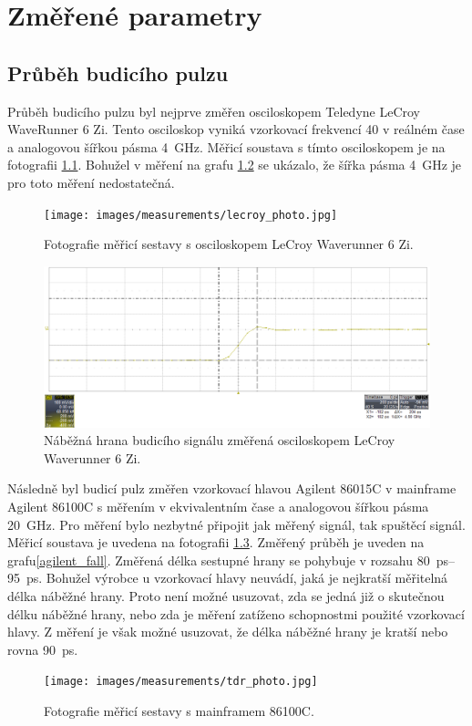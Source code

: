 \chapter{Změřené parametry}

\section{Průběh budicího pulzu}
Průběh budicího pulzu byl nejprve změřen osciloskopem Teledyne LeCroy WaveRunner 6 Zi. Tento osciloskop vyniká vzorkovací frekvencí \SI{40}{\gigasample} v reálném čase a analogovou šířkou pásma \SI{4}{\giga\hertz}. Měřicí soustava s tímto osciloskopem je na fotografii \ref{lecroy_photo}. Bohužel v měření na grafu \ref{lecroy} se ukázalo, že šířka pásma \SI{4}{\giga\hertz} je pro toto měření nedostatečná.

\begin{figure}[htbp]
\texttt{[image: images/measurements/lecroy\_photo.jpg]}\caption{Fotografie měřicí sestavy s osciloskopem LeCroy Waverunner 6 Zi.}\label{lecroy_photo}
\end{figure}

\begin{figure}[htbp]
\includegraphics[width=\textwidth,keepaspectratio]{images/measurements/lecroy.png}\caption{Náběžná hrana budicího signálu změřená osciloskopem LeCroy Waverunner 6 Zi.}\label{lecroy}
\end{figure}

Následně byl budicí pulz změřen vzorkovací hlavou Agilent 86015C v mainframe Agilent 86100C s měřením v ekvivalentním čase a analogovou šířkou pásma \SI{20}{\giga\hertz}. Pro měření bylo nezbytné připojit jak měřený signál, tak spuštěcí signál. Měřicí soustava je uvedena na fotografii \ref{agilent_photo}. Změřený průběh je uveden na grafu\ref{agilent_fall}. Změřená délka sestupné hrany se pohybuje v rozsahu \SIrange{80}{95}{\pico\second}. Bohužel výrobce u vzorkovací hlavy neuvádí, jaká je nejkratší měřitelná délka náběžné hrany. Proto není možné usuzovat, zda se jedná již o skutečnou délku náběžné hrany, nebo zda je měření zatíženo schopnostmi použité vzorkovací hlavy. Z měření je však možné usuzovat, že délka náběžné hrany je kratší nebo rovna \SI{90}{\pico\second}.
\begin{figure}[htbp]
\texttt{[image: images/measurements/tdr\_photo.jpg]}\caption{Fotografie měřicí sestavy s mainframem 86100C.}\label{agilent_photo}
\end{figure}

